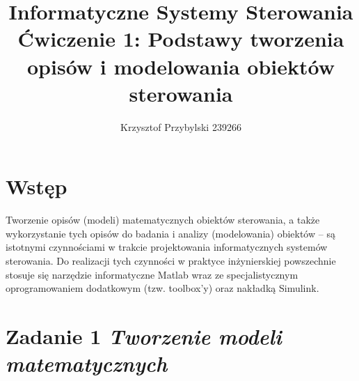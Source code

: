 \documentclass[a4paper,10pt]{article}
\title{Informatyczne Systemy Sterowania \\ \large Ćwiczenie 1: Podstawy tworzenia opisów i modelowania obiektów sterowania}
\author{Krzysztof Przybylski 239266}
\begin{document}
\maketitle

\section{Wstęp}\label{sec:wstęp}
Tworzenie opisów (modeli) matematycznych obiektów sterowania, a także wykorzystanie tych opisów do badania i analizy (modelowania) obiektów – są istotnymi czynnościami w trakcie projektowania informatycznych systemów sterowania. Do realizacji tych czynności w praktyce inżynierskiej powszechnie stosuje się narzędzie informatyczne Matlab wraz ze specjalistycznym oprogramowaniem dodatkowym (tzw. toolbox’y) oraz nakładką Simulink.

\section{Zadanie 1 \textit{\small Tworzenie modeli matematycznych}}\label{sec:zad1}
\end{document}
